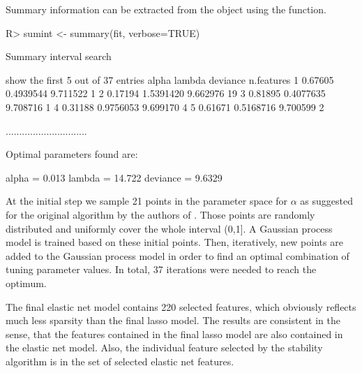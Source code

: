 \documentclass[]{jss}
\begin{document}
Summary information can be extracted from the  object using the  function.
\begin{Schunk}
\begin{Sinput}
R> sumint <- summary(fit, verbose=TRUE)
\end{Sinput}
\begin{Soutput}
Summary interval search 

show the first 5 out of 37 entries
    alpha    lambda deviance n.features
1 0.67605 0.4939544 9.711522          1
2 0.17194 1.5391420 9.662976         19
3 0.81895 0.4077635 9.708716          1
4 0.31188 0.9756053 9.699170          4
5 0.61671 0.5168716 9.700599          2

..............................

 Optimal parameters found are: 

alpha =  0.013 	 lambda =  14.722 deviance =  9.6329
\end{Soutput}
\end{Schunk}

At the initial step we sample 21 points in the parameter space for $\alpha$ as suggested for the original algorithm by the authors of \citep{froehlich2005}. Those points are randomly distributed and uniformly cover the whole interval 
(0,1]. A Gaussian process model is trained based on these initial points. Then, iteratively, new points are added to the Gaussian process model in order to find an optimal combination of tuning parameter values. In total, 37 iterations were needed to reach the optimum. 


The final elastic net model contains 220 selected features, which obviously reflects much less sparsity than the final lasso model.
The results are consistent in the sense, that the features contained in the final lasso model are also contained in the elastic net model. Also, the individual feature selected by the stability algorithm is in the set of selected elastic net features.
\end{document}
